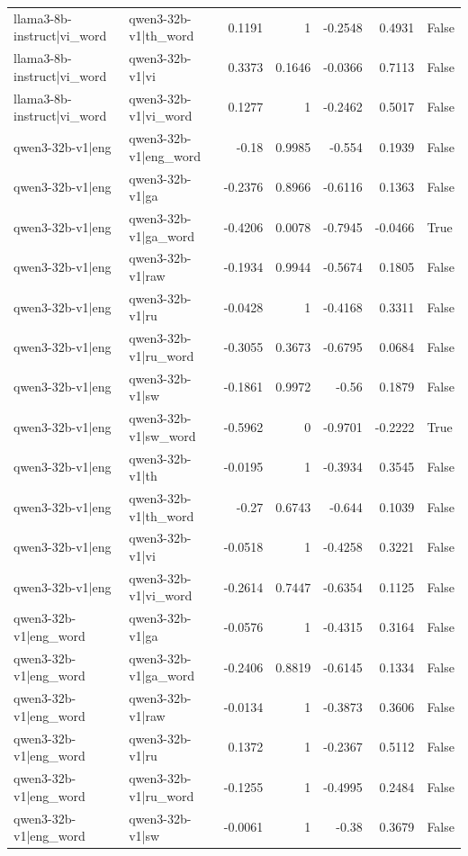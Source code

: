 \begin{table}
\begin{tabular}{l l r r r r l}
llama3-8b-instruct|vi_word & qwen3-32b-v1|th_word & 0.1191 & 1 & -0.2548 & 0.4931 & False \\
llama3-8b-instruct|vi_word & qwen3-32b-v1|vi & 0.3373 & 0.1646 & -0.0366 & 0.7113 & False \\
llama3-8b-instruct|vi_word & qwen3-32b-v1|vi_word & 0.1277 & 1 & -0.2462 & 0.5017 & False \\
qwen3-32b-v1|eng & qwen3-32b-v1|eng_word & -0.18 & 0.9985 & -0.554 & 0.1939 & False \\
qwen3-32b-v1|eng & qwen3-32b-v1|ga & -0.2376 & 0.8966 & -0.6116 & 0.1363 & False \\
qwen3-32b-v1|eng & qwen3-32b-v1|ga_word & -0.4206 & 0.0078 & -0.7945 & -0.0466 & True \\
qwen3-32b-v1|eng & qwen3-32b-v1|raw & -0.1934 & 0.9944 & -0.5674 & 0.1805 & False \\
qwen3-32b-v1|eng & qwen3-32b-v1|ru & -0.0428 & 1 & -0.4168 & 0.3311 & False \\
qwen3-32b-v1|eng & qwen3-32b-v1|ru_word & -0.3055 & 0.3673 & -0.6795 & 0.0684 & False \\
qwen3-32b-v1|eng & qwen3-32b-v1|sw & -0.1861 & 0.9972 & -0.56 & 0.1879 & False \\
qwen3-32b-v1|eng & qwen3-32b-v1|sw_word & -0.5962 & 0 & -0.9701 & -0.2222 & True \\
qwen3-32b-v1|eng & qwen3-32b-v1|th & -0.0195 & 1 & -0.3934 & 0.3545 & False \\
qwen3-32b-v1|eng & qwen3-32b-v1|th_word & -0.27 & 0.6743 & -0.644 & 0.1039 & False \\
qwen3-32b-v1|eng & qwen3-32b-v1|vi & -0.0518 & 1 & -0.4258 & 0.3221 & False \\
qwen3-32b-v1|eng & qwen3-32b-v1|vi_word & -0.2614 & 0.7447 & -0.6354 & 0.1125 & False \\
qwen3-32b-v1|eng_word & qwen3-32b-v1|ga & -0.0576 & 1 & -0.4315 & 0.3164 & False \\
qwen3-32b-v1|eng_word & qwen3-32b-v1|ga_word & -0.2406 & 0.8819 & -0.6145 & 0.1334 & False \\
qwen3-32b-v1|eng_word & qwen3-32b-v1|raw & -0.0134 & 1 & -0.3873 & 0.3606 & False \\
qwen3-32b-v1|eng_word & qwen3-32b-v1|ru & 0.1372 & 1 & -0.2367 & 0.5112 & False \\
qwen3-32b-v1|eng_word & qwen3-32b-v1|ru_word & -0.1255 & 1 & -0.4995 & 0.2484 & False \\
qwen3-32b-v1|eng_word & qwen3-32b-v1|sw & -0.0061 & 1 & -0.38 & 0.3679 & False \\

\end{tabular}
\end{table}
